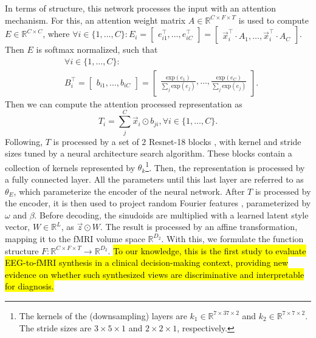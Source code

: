 \documentclass{article}
\begin{document}
In terms of structure, this network processes the input with an attention mechanism. For this, an attention weight matrix $A \in \mathbb{R}^{C \times F \times T}$ is used to compute $E \in \mathbb{R}^{C \times C}$, where $\forall i \in \{1, \dots, C\}: E_i = \begin{bmatrix} e_{i1}^\top, \dots, e_{iC}^\top \end{bmatrix} = \begin{bmatrix} \vec{x}_i^\top \cdot A_1, \dots, \vec{x}_i^\top \cdot A_C \end{bmatrix}$. Then $E$ is softmax normalized, such that 
\begin{align*}
    &\forall i \in \{1, \dots, C\}: \\&B_i^\top = \begin{bmatrix} b_{i1}, \dots, b_{iC}\end{bmatrix} = \begin{bmatrix} \frac{\mbox{exp}(e_1)}{\sum_j \mbox{exp}(e_j)} , \dots, \frac{\mbox{exp}(e_C)}{\sum_j \mbox{exp}(e_j)} \end{bmatrix}.
\end{align*}
Then we can compute the attention processed representation as
\begin{equation}\label{equation:attention_output}
    T_i  = \sum_j^C \vec{x}_i \odot b_{ji}, \forall i \in \{1, \dots, C\}.
\end{equation}
Following, $T$ is processed by a set of $2$ Resnet-18 blocks \cite{he2016deep}, with kernel and stride sizes tuned by a neural architecture search algorithm. These blocks contain a collection of kernels represented by $\theta_k$\footnote{The kernels of the (downsampling) layers are $k_1 \in \mathbb{R}^{7 \times 37 \times 2}$ and $k_2 \in \mathbb{R}^{7 \times 7 \times 2}$. The stride sizes are $3 \times 5 \times 1$ and $2 \times 2 \times 1$, respectively.}. Then, the representation is processed by a fully connected layer. All the parameters until this last layer are referred to as $\theta_E$, which parameterize the encoder of the neural network. After $T$ is processed by the encoder, it is then used to project random Fourier features \cite{rahimi2007random,tancik2020fourier}, parameterized by $\omega$ and $\beta$. Before decoding, the sinudoids are multiplied with a learned latent style vector, $W \in \mathbb{R}^L$, as $\vec{z} \odot W$. The result is processed by an affine transformation, mapping it to the fMRI volume space $\mathbb{R}^{D_2}$. With this, we formulate the function structure $F: \mathbb{R}^{C \times F \times T} \to \mathbb{R}^{D_2}$. \hl{To our knowledge, this is the first study to evaluate EEG-to-fMRI synthesis in a clinical decision-making context, providing new evidence on whether such synthesized views are discriminative and interpretable for diagnosis.}
\end{document}
